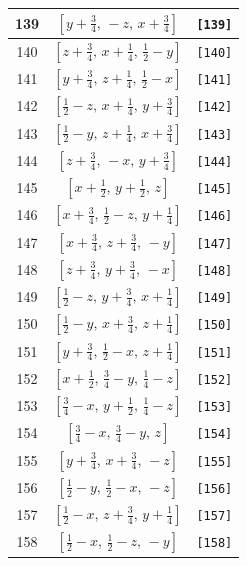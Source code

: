 \documentclass[fleqn,8pt]{jsarticle}
\begin{document}
\begin{longtable}{ccc}
139 & $\left[ y + \frac{3}{4},\, - z,\, x + \frac{3}{4} \right]$ & {\tt [139]} \\ \hline
140 & $\left[ z + \frac{3}{4},\, x + \frac{1}{4},\, \frac{1}{2} - y \right]$ & {\tt [140]} \\ \hline
141 & $\left[ y + \frac{3}{4},\, z + \frac{1}{4},\, \frac{1}{2} - x \right]$ & {\tt [141]} \\ \hline
142 & $\left[ \frac{1}{2} - z,\, x + \frac{1}{4},\, y + \frac{3}{4} \right]$ & {\tt [142]} \\ \hline
143 & $\left[ \frac{1}{2} - y,\, z + \frac{1}{4},\, x + \frac{3}{4} \right]$ & {\tt [143]} \\ \hline
144 & $\left[ z + \frac{3}{4},\, - x,\, y + \frac{3}{4} \right]$ & {\tt [144]} \\ \hline
145 & $\left[ x + \frac{1}{2},\, y + \frac{1}{2},\, z \right]$ & {\tt [145]} \\ \hline
146 & $\left[ x + \frac{3}{4},\, \frac{1}{2} - z,\, y + \frac{1}{4} \right]$ & {\tt [146]} \\ \hline
147 & $\left[ x + \frac{3}{4},\, z + \frac{3}{4},\, - y \right]$ & {\tt [147]} \\ \hline
148 & $\left[ z + \frac{3}{4},\, y + \frac{3}{4},\, - x \right]$ & {\tt [148]} \\ \hline
149 & $\left[ \frac{1}{2} - z,\, y + \frac{3}{4},\, x + \frac{1}{4} \right]$ & {\tt [149]} \\ \hline
150 & $\left[ \frac{1}{2} - y,\, x + \frac{3}{4},\, z + \frac{1}{4} \right]$ & {\tt [150]} \\ \hline
151 & $\left[ y + \frac{3}{4},\, \frac{1}{2} - x,\, z + \frac{1}{4} \right]$ & {\tt [151]} \\ \hline
152 & $\left[ x + \frac{1}{2},\, \frac{3}{4} - y,\, \frac{1}{4} - z \right]$ & {\tt [152]} \\ \hline
153 & $\left[ \frac{3}{4} - x,\, y + \frac{1}{2},\, \frac{1}{4} - z \right]$ & {\tt [153]} \\ \hline
154 & $\left[ \frac{3}{4} - x,\, \frac{3}{4} - y,\, z \right]$ & {\tt [154]} \\ \hline
155 & $\left[ y + \frac{3}{4},\, x + \frac{3}{4},\, - z \right]$ & {\tt [155]} \\ \hline
156 & $\left[ \frac{1}{2} - y,\, \frac{1}{2} - x,\, - z \right]$ & {\tt [156]} \\ \hline
157 & $\left[ \frac{1}{2} - x,\, z + \frac{3}{4},\, y + \frac{1}{4} \right]$ & {\tt [157]} \\ \hline
158 & $\left[ \frac{1}{2} - x,\, \frac{1}{2} - z,\, - y \right]$ & {\tt [158]} \\ \hline

\end{longtable}
\end{document}
